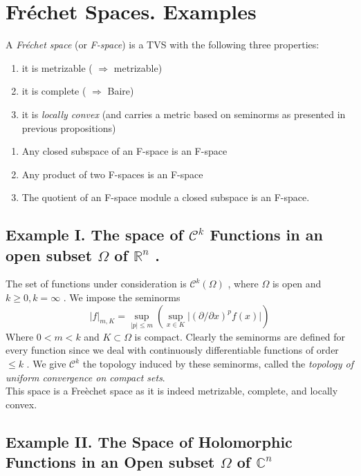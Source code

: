 \section{Fr\'echet Spaces. Examples}

A \textit{Fr\'echet space} (or \textit{F-space}) is a TVS with the following three properties:

\begin{enumerate}
	\item it is metrizable ( $ \Rightarrow $ metrizable)
	\item it is complete ( $ \Rightarrow $ Baire)
	\item it is \textit{locally convex} (and carries a metric based on seminorms as presented in previous propositions)
\end{enumerate}

\begin{prop}
	\begin{enumerate}
		\item Any closed subspace of an F-space is an F-space
		\item Any product of two F-spaces is an F-space
		\item The quotient of an F-space module a closed subspace is an F-space.
	\end{enumerate}
\end{prop}

\subsection{Example I. The space of $ \mathcal{C}^{ k } $ Functions in an open subset $ \Omega $ of $ \mathbb{R}^{ n } $ .}

The set of functions under consideration is $ \mathcal{C}^{ k } \left( \Omega \right) $ , where $ \Omega $ is open and $ k \geq 0, k= \infty $ . We impose the seminorms 
\[
	\vert f \vert_{ m,K } = \sup_{ \vert p \vert \leq m } \left( \sup_{ x \in K } \vert (\partial/\partial x)^{ p } f(x) \vert \right)
\]
Where $ 0 < m < k $ and $ K \subset \Omega $ is compact. Clearly the seminorms are defined for every function since we deal with continuously differentiable functions of order $ \leq k $ . We give $ \mathcal{C}^{ k } $ the topology induced by these seminorms, called the \textit{topology of uniform convergence on compact sets}. \\
\indent This space is a Fre\`echet space as it is indeed metrizable, complete, and locally convex.

\subsection{Example II. The Space of Holomorphic Functions in an Open subset $ \Omega $ of $ \mathbb{C}^{ n } $ }

